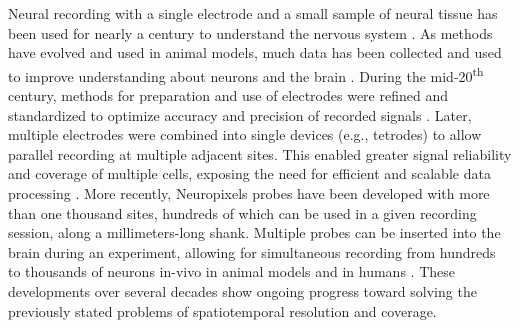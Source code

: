 \documentclass[11pt]{article}
\begin{document}
Neural recording with a single electrode and a small sample of neural tissue has been used for nearly a century to understand the nervous system \cite{piccolino1997galvani, adrian1928basis}. As methods have evolved and used in animal models, much data has been collected and used to improve understanding about neurons and the brain \cite{ibl2022datarelease, wilson1993ensemble}. During the mid-20\textsuperscript{th} century, methods for preparation and use of electrodes were refined and standardized to optimize accuracy and precision of recorded signals \cite{dowben1953electrode, green1958microelectrode}. Later, multiple electrodes were combined into single devices (e.g., tetrodes) to allow parallel recording at multiple adjacent sites. This enabled greater signal reliability and coverage of multiple cells, exposing the need for efficient and scalable data processing \cite{mcnaughton1983tetrode, wilson1993ensemble, jog2002tetrode}. More recently, Neuropixels probes have been developed with more than one thousand sites, hundreds of which can be used in a given recording session, along a millimeters-long shank. Multiple probes can be inserted into the brain during an experiment, allowing for simultaneous recording from hundreds to thousands of neurons in-vivo in animal models and in humans \cite{jun2017probes, steinmetz2021probes, paulk2022probes, ibl2022datarelease}. These developments over several decades show ongoing progress toward solving the previously stated problems of spatiotemporal resolution and coverage.
\end{document}
